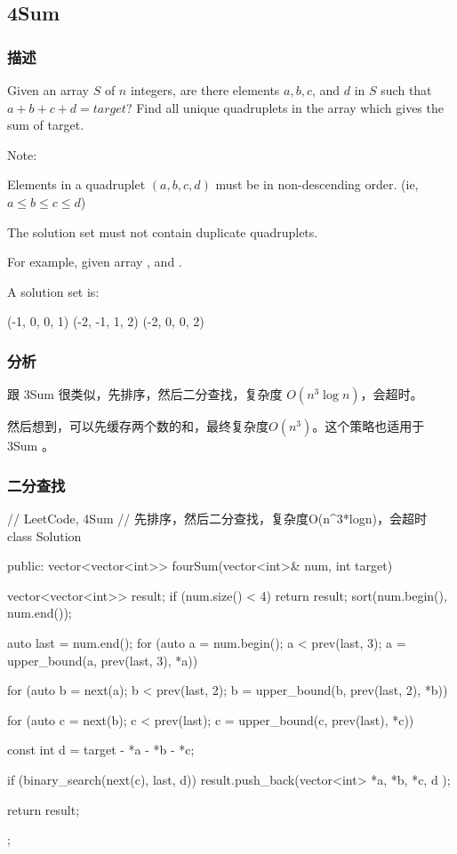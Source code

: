 \subsection{4Sum} %
\label{sec:4sum}


\subsubsection{描述}
Given an array $S$ of $n$ integers, are there elements $a, b, c$, and $d$ in $S$ such that $a + b + c + d = target$? Find all unique quadruplets in the array which gives the sum of target.

Note:
\begindot
\item Elements in a quadruplet $(a,b,c,d)$ must be in non-descending order. (ie, $a \leq b \leq c \leq d$)
\item The solution set must not contain duplicate quadruplets.
\myenddot

For example, given array , and . 

A solution set is:
\begin{Code}
(-1,  0, 0, 1)
(-2, -1, 1, 2)
(-2,  0, 0, 2)
\end{Code}


\subsubsection{分析}
跟 3Sum 很类似，先排序，然后二分查找，复杂度 $O(n^3 \log n)$，会超时。

然后想到，可以先缓存两个数的和，最终复杂度$O(n^3)$。这个策略也适用于 3Sum 。


\subsubsection{二分查找}
\begin{Code}
// LeetCode, 4Sum
// 先排序，然后二分查找，复杂度O(n^3*logn)，会超时
class Solution {
public:
    vector<vector<int>> fourSum(vector<int>& num, int target) {
        vector<vector<int>> result;
        if (num.size() < 4) return result;
        sort(num.begin(), num.end());

        auto last = num.end();
        for (auto a = num.begin(); a < prev(last, 3);
                a = upper_bound(a, prev(last, 3), *a)) {
            for (auto b = next(a); b < prev(last, 2);
                    b = upper_bound(b, prev(last, 2), *b)) {
                for (auto c = next(b); c < prev(last);
                        c = upper_bound(c, prev(last), *c)) {
                    const int d = target - *a - *b - *c;

                    if (binary_search(next(c), last, d))
                        result.push_back(vector<int> { *a, *b, *c, d });
                }
            }
        }

        return result;
    }
};
\end{Code}


